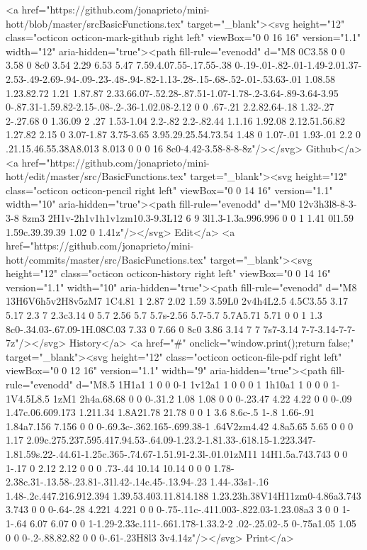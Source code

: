 {      <a href="https://github.com/jonaprieto/mini-hott/blob/master/srcBasicFunctions.tex" target="_blank"><svg height="12" class="octicon octicon-mark-github right left" viewBox="0 0 16 16" version="1.1" width="12" aria-hidden="true"><path fill-rule="evenodd" d="M8 0C3.58 0 0 3.58 0 8c0 3.54 2.29 6.53 5.47 7.59.4.07.55-.17.55-.38 0-.19-.01-.82-.01-1.49-2.01.37-2.53-.49-2.69-.94-.09-.23-.48-.94-.82-1.13-.28-.15-.68-.52-.01-.53.63-.01 1.08.58 1.23.82.72 1.21 1.87.87 2.33.66.07-.52.28-.87.51-1.07-1.78-.2-3.64-.89-3.64-3.95 0-.87.31-1.59.82-2.15-.08-.2-.36-1.02.08-2.12 0 0 .67-.21 2.2.82.64-.18 1.32-.27 2-.27.68 0 1.36.09 2 .27 1.53-1.04 2.2-.82 2.2-.82.44 1.1.16 1.92.08 2.12.51.56.82 1.27.82 2.15 0 3.07-1.87 3.75-3.65 3.95.29.25.54.73.54 1.48 0 1.07-.01 1.93-.01 2.2 0 .21.15.46.55.38A8.013 8.013 0 0 0 16 8c0-4.42-3.58-8-8-8z"/></svg> Github</a>
      <a href="https://github.com/jonaprieto/mini-hott/edit/master/src/BasicFunctions.tex" target="_blank"><svg height="12" class="octicon octicon-pencil right left" viewBox="0 0 14 16" version="1.1" width="10" aria-hidden="true"><path fill-rule="evenodd" d="M0 12v3h3l8-8-3-3-8 8zm3 2H1v-2h1v1h1v1zm10.3-9.3L12 6 9 3l1.3-1.3a.996.996 0 0 1 1.41 0l1.59 1.59c.39.39.39 1.02 0 1.41z"/></svg> Edit</a>
      <a href="https://github.com/jonaprieto/mini-hott/commits/master/src/BasicFunctions.tex" target="_blank"><svg height="12" class="octicon octicon-history right left" viewBox="0 0 14 16" version="1.1" width="10" aria-hidden="true"><path fill-rule="evenodd" d="M8 13H6V6h5v2H8v5zM7 1C4.81 1 2.87 2.02 1.59 3.59L0 2v4h4L2.5 4.5C3.55 3.17 5.17 2.3 7 2.3c3.14 0 5.7 2.56 5.7 5.7s-2.56 5.7-5.7 5.7A5.71 5.71 0 0 1 1.3 8c0-.34.03-.67.09-1H.08C.03 7.33 0 7.66 0 8c0 3.86 3.14 7 7 7s7-3.14 7-7-3.14-7-7-7z"/></svg> History</a>
      <a  href="#" onclick="window.print();return false;" target="_blank"><svg height="12" class="octicon octicon-file-pdf right left" viewBox="0 0 12 16" version="1.1" width="9" aria-hidden="true"><path fill-rule="evenodd" d="M8.5 1H1a1 1 0 0 0-1 1v12a1 1 0 0 0 1 1h10a1 1 0 0 0 1-1V4.5L8.5 1zM1 2h4a.68.68 0 0 0-.31.2 1.08 1.08 0 0 0-.23.47 4.22 4.22 0 0 0-.09 1.47c.06.609.173 1.211.34 1.8A21.78 21.78 0 0 1 3.6 8.6c-.5 1-.8 1.66-.91 1.84a7.156 7.156 0 0 0-.69.3c-.362.165-.699.38-1 .64V2zm4.42 4.8a5.65 5.65 0 0 0 1.17 2.09c.275.237.595.417.94.53-.64.09-1.23.2-1.81.33-.618.15-1.223.347-1.81.59s.22-.44.61-1.25c.365-.74.67-1.51.91-2.3l-.01.01zM11 14H1.5a.743.743 0 0 1-.17 0 2.12 2.12 0 0 0 .73-.44 10.14 10.14 0 0 0 1.78-2.38c.31-.13.58-.23.81-.31l.42-.14c.45-.13.94-.23 1.44-.33s1-.16 1.48-.2c.447.216.912.394 1.39.53.403.11.814.188 1.23.23h.38V14H11zm0-4.86a3.743 3.743 0 0 0-.64-.28 4.221 4.221 0 0 0-.75-.11c-.411.003-.822.03-1.23.08a3 3 0 0 1-1-.64 6.07 6.07 0 0 1-1.29-2.33c.111-.661.178-1.33.2-2 .02-.25.02-.5 0-.75a1.05 1.05 0 0 0-.2-.88.82.82 0 0 0-.61-.23H8l3 3v4.14z"/></svg> Print</a>
}
